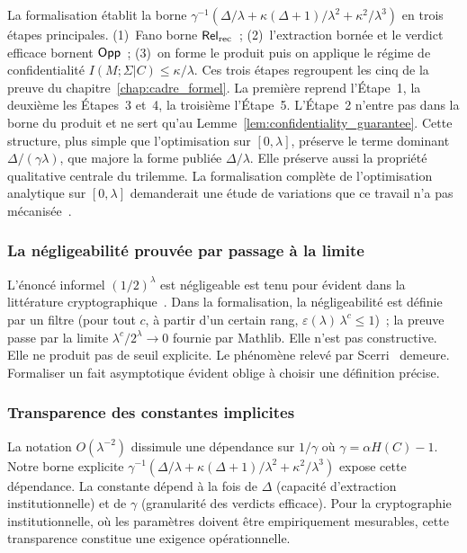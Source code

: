 \begin{sloppypar}
La formalisation \'etablit la borne
$\gamma^{-1}(\Delta/\lambda + \kappa(\Delta+1)/\lambda^2 + \kappa^2/\lambda^3)$
en trois \'etapes principales. (1)~Fano borne $\mathsf{Rel}_{\mathrm{rec}}$~; (2)~l'extraction
born\'ee et le verdict efficace bornent $\mathsf{Opp}$~; (3)~on forme le produit
puis on applique le r\'egime de confidentialit\'e
$I(M;\Sigma|C) \leq \kappa/\lambda$. Ces trois \'etapes regroupent les cinq de la
preuve du chapitre~\ref{chap:cadre_formel}. La premi\`ere reprend l'\'Etape~1, la
deuxi\`eme les \'Etapes~3 et~4, la troisi\`eme l'\'Etape~5. L'\'Etape~2 n'entre pas dans
la borne du produit et ne sert qu'au Lemme~\ref{lem:confidentiality_guarantee}.
Cette structure, plus simple que
l'optimisation sur $[0,\lambda]$, pr\'eserve le terme dominant
$\Delta/(\gamma\lambda)$, que majore la forme publi\'ee $\Delta/\lambda$. Elle pr\'eserve aussi la propri\'et\'e qualitative centrale du trilemme.
La formalisation compl\`ete de l'optimisation analytique sur
$[0,\lambda]$ demanderait une \'etude de variations que ce travail n'a pas
m\'ecanis\'ee~\cite{MathlibAnalysis,Tsybakov2009,Scerri14}.

\subsubsection{La n\'egligeabilit\'e prouv\'ee par passage \`a la limite}
\label{subsubsec:necessite_analyse_cas}

L'\'enonc\'e informel \og $(1/2)^\lambda$ est n\'egligeable\fg{} est tenu
pour \'evident dans la litt\'erature
cryptographique~\cite{Goldreich01,KatzLindell14}. Dans la formalisation, la
n\'egligeabilit\'e est d\'efinie par un filtre (\og pour tout $c$, \`a partir d'un
certain rang, $\varepsilon(\lambda)\,\lambda^c \leq 1$\fg)~; la preuve passe par
la limite $\lambda^c/2^\lambda \to 0$ fournie par Mathlib. Elle n'est pas
constructive. Elle ne produit pas de seuil explicite. Le ph\'enom\`ene relev\'e par Scerri~\cite{Scerri14} demeure.
Formaliser un fait asymptotique \og \'evident\fg{} oblige \`a choisir une
d\'efinition pr\'ecise.

\subsubsection{Transparence des constantes implicites}
\label{subsubsec:transparence_constantes}

La notation $O(\lambda^{-2})$ dissimule une d\'ependance sur
$1/\gamma$ o\`u $\gamma = \alpha H(C) - 1$. Notre borne explicite
$\gamma^{-1}(\Delta/\lambda + \kappa(\Delta+1)/\lambda^2 +
\kappa^2/\lambda^3)$ expose cette d\'ependance. La constante
d\'epend \`a la fois de $\Delta$ (capacit\'e d'extraction
institutionnelle) et de $\gamma$ (granularit\'e des verdicts
efficace). Pour la cryptographie
institutionnelle, o\`u les param\`etres doivent \^etre empiriquement
mesurables, cette transparence constitue une
exigence op\'erationnelle.


\end{sloppypar}
